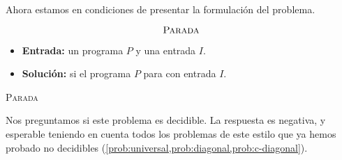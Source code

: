 Ahora estamos en condiciones de presentar la formulación del problema.
\vspace{8pt}
\begin{problema}
\begin{framed}
$$\text{\textsc{Parada}}$$

\begin{itemize}
    \item \textbf{Entrada:} un programa $P$ y una entrada $I$.
    \item \textbf{Solución:} si el programa $P$ para con entrada $I$.
\end{itemize}
\end{framed}
\caption{\textsc{Parada}}
\label{prob:parada}
\end{problema}
Nos preguntamos si este problema es decidible. La respuesta es negativa, y esperable teniendo en cuenta todos los problemas de este estilo que ya hemos probado no decidibles (\cref{prob:universal,prob:diagonal,prob:c-diagonal}).

